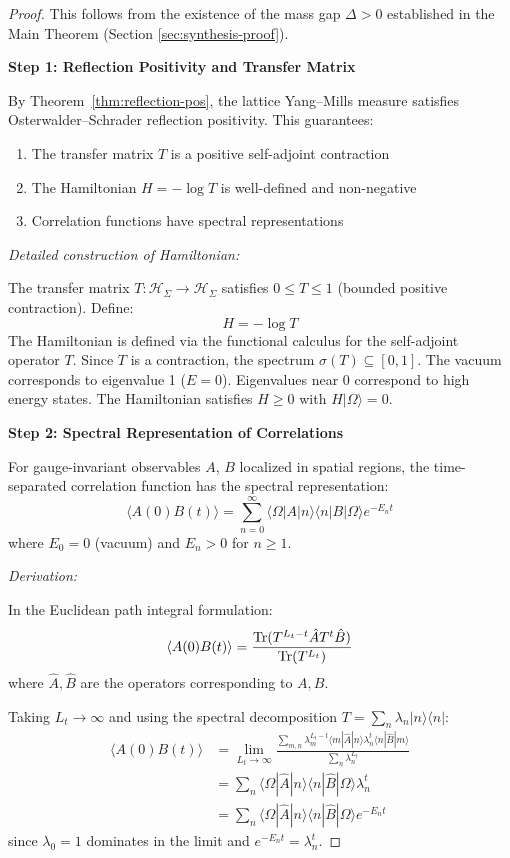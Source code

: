\begin{proof}
This follows from the existence of the mass gap $\Delta > 0$ established in the Main Theorem (Section \ref{sec:synthesis-proof}).

\textbf{Step 1: Reflection Positivity and Transfer Matrix}

By Theorem~\ref{thm:reflection-pos}, the lattice Yang--Mills measure 
satisfies Osterwalder--Schrader reflection positivity. This guarantees:
\begin{enumerate}[label=(\alph*)]
\item The transfer matrix $T$ is a positive self-adjoint contraction
\item The Hamiltonian $H = -\log T$ is well-defined and non-negative
\item Correlation functions have spectral representations
\end{enumerate}

\textit{Detailed construction of Hamiltonian:}

The transfer matrix $T : \mathcal{H}_\Sigma \to \mathcal{H}_\Sigma$ satisfies 
$0 \leq T \leq 1$ (bounded positive contraction). Define:
\[
H = -\log T
\]
The Hamiltonian is defined via the functional calculus for the self-adjoint operator $T$. Since $T$ is a contraction, the spectrum $\sigma(T) \subseteq [0, 1]$. The vacuum corresponds to eigenvalue 1 ($E=0$). Eigenvalues near 0 correspond to high energy states.
The Hamiltonian satisfies $H \geq 0$ with $H|\Omega\rangle = 0$.

\textbf{Step 2: Spectral Representation of Correlations}

For gauge-invariant observables $A$, $B$ localized in spatial regions, the 
time-separated correlation function has the spectral representation:
\[
\langle A(0) B(t) \rangle = \sum_{n=0}^\infty \langle \Omega | A | n \rangle 
\langle n | B | \Omega \rangle e^{-E_n t}
\]
where $E_0 = 0$ (vacuum) and $E_n > 0$ for $n \geq 1$.

\textit{Derivation:}

In the Euclidean path integral formulation:
\[
\langle A(0) B(t) \rangle = \frac{\operatorname{Tr}(T^{L_t - t} \hat{A} T^t \hat{B})}{\operatorname{Tr}(T^{L_t})}
\]
where $\hat{A}, \hat{B}$ are the operators corresponding to $A, B$.

Taking $L_t \to \infty$ and using the spectral decomposition $T = \sum_n \lambda_n |n\rangle\langle n|$:
\begin{align*}
\langle A(0) B(t) \rangle &= \lim_{L_t \to \infty} 
\frac{\sum_{m,n} \lambda_m^{L_t - t} \langle m|\hat{A}|n\rangle \lambda_n^t \langle n|\hat{B}|m\rangle}{\sum_n \lambda_n^{L_t}} \\
&= \sum_n \langle \Omega|\hat{A}|n\rangle \langle n|\hat{B}|\Omega\rangle \lambda_n^t \\
&= \sum_n \langle \Omega|\hat{A}|n\rangle \langle n|\hat{B}|\Omega\rangle e^{-E_n t}
\end{align*}
since $\lambda_0 = 1$ dominates in the limit and $e^{-E_n t} = \lambda_n^t$.


\end{proof}
